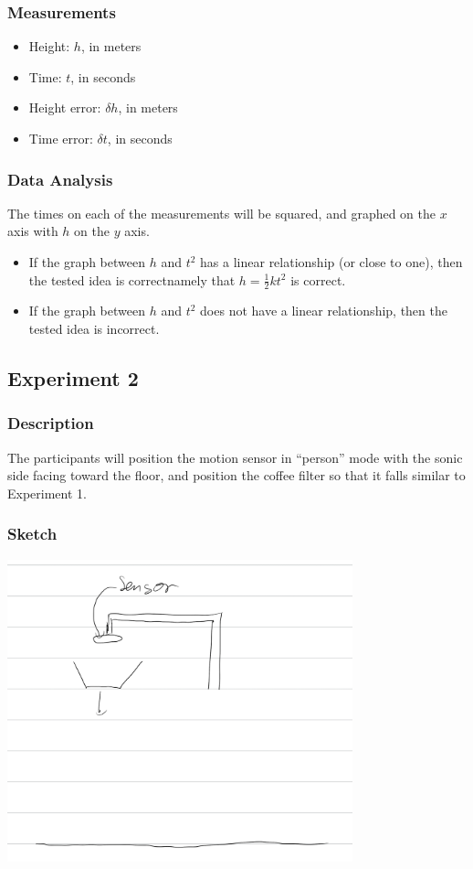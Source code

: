 \documentclass[8pt]{extarticle}
\begin{document}
{\subsubsection*{Measurements}
\begin{itemize}
	\item Height: $h$, in meters
	\item Time: $t$, in seconds
	\item Height error: $\delta h$, in meters
	\item Time error: $\delta t$, in seconds
\end{itemize}
\subsubsection*{Data Analysis}
The times on each of the measurements will be squared, and graphed on the $x$ axis with $h$ on the $y$ axis.
\begin{itemize}
	\item If the graph between $h$ and $t^2$ has a linear relationship (or close to one), then the tested idea is correct\textemdash namely that $h = \frac{1}{2} kt^2$ is correct.
	\item If the graph between $h$ and $t^2$ does not have a linear relationship, then the tested idea is incorrect.
\end{itemize}
\subsection*{Experiment 2}
\subsubsection*{Description}
The participants will position the motion sensor in ``person'' mode with the sonic side facing toward the floor, and position the coffee filter so that it falls similar to Experiment 1.
\subsubsection*{Sketch}
\begin{center}
	\includegraphics[width=10cm]{Lab6Image1_2}
\end{center}
}
\end{document}

